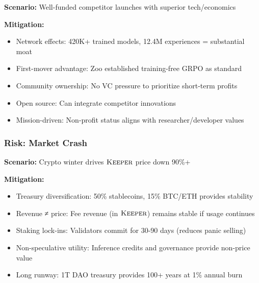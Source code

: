 \textbf{Scenario:} Well-funded competitor launches with superior tech/economics

\textbf{Mitigation:}
\begin{itemize}
\item Network effects: 420K+ trained models, 12.4M experiences = substantial moat
\item First-mover advantage: Zoo established training-free GRPO as standard
\item Community ownership: No VC pressure to prioritize short-term profits
\item Open source: Can integrate competitor innovations
\item Mission-driven: Non-profit status aligns with researcher/developer values
\end{itemize}

\subsubsection{Risk: Market Crash}

\textbf{Scenario:} Crypto winter drives $\textsc{Keeper}$ price down 90\%+

\textbf{Mitigation:}
\begin{itemize}
\item Treasury diversification: 50\% stablecoins, 15\% BTC/ETH provides stability
\item Revenue ≠ price: Fee revenue (in $\textsc{Keeper}$) remains stable if usage continues
\item Staking lock-ins: Validators commit for 30-90 days (reduces panic selling)
\item Non-speculative utility: Inference credits and governance provide non-price value
\item Long runway: 1T DAO treasury provides 100+ years at 1\% annual burn
\end{itemize}

